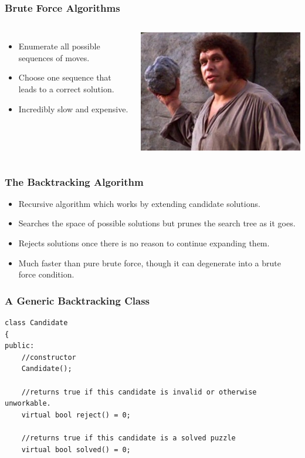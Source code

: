 \documentclass{beamer}
\begin{document}
\begin{frame}
    \frametitle{Brute Force Algorithms}
    \begin{columns}
    \begin{itemize}[<+->]
        \item Enumerate all possible sequences of moves.
        \item Choose one sequence that leads to a correct solution.
        \item Incredibly slow and expensive.
    \end{itemize}
    \includegraphics[width=\textwidth]{images/brute}
    \end{columns}
\end{frame}

\begin{frame}
    \frametitle{The Backtracking Algorithm}
    \begin{itemize}[<+->]
        \item Recursive algorithm which works by extending candidate solutions.
        \item Searches the space of possible solutions but prunes the search tree as it goes.
        \item Rejects solutions once there is no reason to continue expanding them.
        \item Much faster than pure brute force, though it can degenerate into a brute force condition.
    \end{itemize}
\end{frame}

\begin{frame}[fragile]
    \frametitle{A Generic Backtracking Class}
    \begin{verbatim}
class Candidate
{
public:
    //constructor
    Candidate();

    //returns true if this candidate is invalid or otherwise unworkable.
    virtual bool reject() = 0;
    
    //returns true if this candidate is a solved puzzle
    virtual bool solved() = 0;
    \end{verbatim}
\end{frame}
\end{document}
